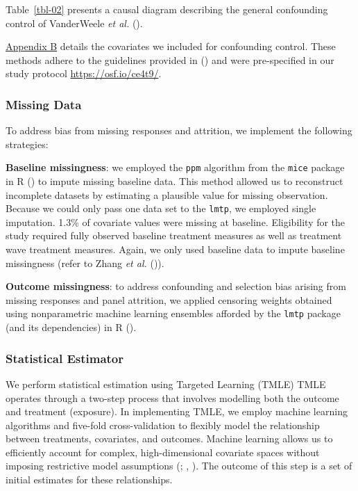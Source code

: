 \documentclass[
  single column]{article}
\begin{document}
Table~\ref{tbl-02} presents a causal diagram describing the general
confounding control of VanderWeele \emph{et al.}
().

\hyperref[appendix-demographics]{Appendix B} details the covariates we
included for confounding control. These methods adhere to the guidelines
provided in () and
were pre-specified in our study protocol \url{https://osf.io/ce4t9/}.

\subsubsection{Missing Data}\label{missing-data}

To address bias from missing responses and attrition, we implement the
following strategies:

\textbf{Baseline missingness}: we employed the \texttt{ppm} algorithm
from the \texttt{mice} package in R () to impute missing baseline data. This method allowed us to
reconstruct incomplete datasets by estimating a plausible value for
missing observation. Because we could only pass one data set to the
\texttt{lmtp}, we employed single imputation. 1.3\% of covariate values
were missing at baseline. Eligibility for the study required fully
observed baseline treatment measures as well as treatment wave treatment
measures. Again, we only used baseline data to impute baseline
missingness (refer to Zhang \emph{et al.}
()).

\textbf{Outcome missingness}: to address confounding and selection bias
arising from missing responses and panel attrition, we applied censoring
weights obtained using nonparametric machine learning ensembles afforded
by the \texttt{lmtp} package (and its dependencies) in R
().

\subsubsection{Statistical Estimator}\label{statistical-estimator}

We perform statistical estimation using Targeted Learning (TMLE) TMLE
operates through a two-step process that involves modelling both the
outcome and treatment (exposure). In implementing TMLE, we employ
machine learning algorithms and five-fold cross-validation to flexibly
model the relationship between treatments, covariates, and outcomes.
Machine learning allows us to efficiently account for complex,
high-dimensional covariate spaces without imposing restrictive model
assumptions (;
,
). The outcome of this step is a set
of initial estimates for these relationships.
\end{document}
